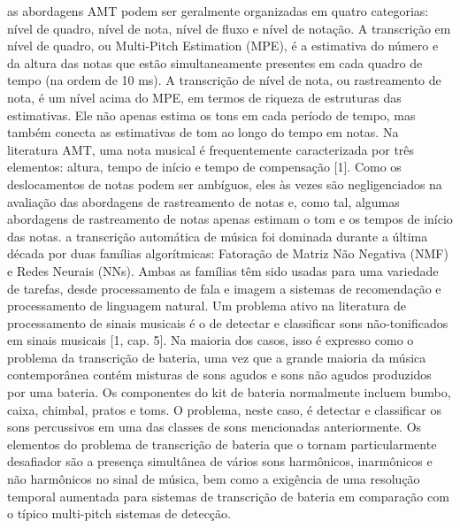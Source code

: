 \documentclass{article}
\begin{document}
as abordagens AMT podem ser geralmente organizadas em quatro categorias: nível de quadro, nível de nota, nível de fluxo e nível de notação.
A transcrição em nível de quadro, ou Multi-Pitch Estimation (MPE), é a estimativa do número e da altura das notas que estão simultaneamente presentes em cada quadro de tempo (na ordem de 10 ms).
A transcrição de nível de nota, ou rastreamento de nota, é um nível acima do MPE, em termos de riqueza de estruturas das estimativas. Ele não apenas estima os tons em cada período de tempo, mas também conecta as estimativas de tom ao longo do tempo em notas.
Na literatura AMT, uma nota musical é frequentemente caracterizada por três elementos: altura, tempo de início e tempo de compensação [1]. Como os deslocamentos de notas podem ser ambíguos, eles às vezes são negligenciados na avaliação das abordagens de rastreamento de notas e, como tal, algumas abordagens de rastreamento de notas apenas estimam o tom e os tempos de início das notas.
a transcrição automática de música foi dominada durante a última década por duas famílias algorítmicas: Fatoração de Matriz Não Negativa (NMF) e Redes Neurais (NNs). Ambas as famílias têm sido usadas para uma variedade de tarefas, desde processamento de fala e imagem a sistemas de recomendação e processamento de linguagem natural.
Um problema ativo na literatura de processamento de sinais musicais é o de detectar e classificar sons não-tonificados em sinais musicais [1, cap. 5]. Na maioria dos casos, isso é expresso como o problema da transcrição de bateria, uma vez que a grande maioria da música contemporânea contém misturas de sons agudos e sons não agudos produzidos por uma bateria. Os componentes do kit de bateria normalmente incluem bumbo, caixa, chimbal, pratos e toms. O problema, neste caso, é detectar e classificar os sons percussivos em uma das classes de sons mencionadas anteriormente. Os elementos do problema de transcrição de bateria que o tornam particularmente desafiador são a presença simultânea de vários sons harmônicos, inarmônicos e não harmônicos no sinal de música, bem como a exigência de uma resolução temporal aumentada para sistemas de transcrição de bateria em comparação com o típico multi-pitch sistemas de detecção.
\end{document}
